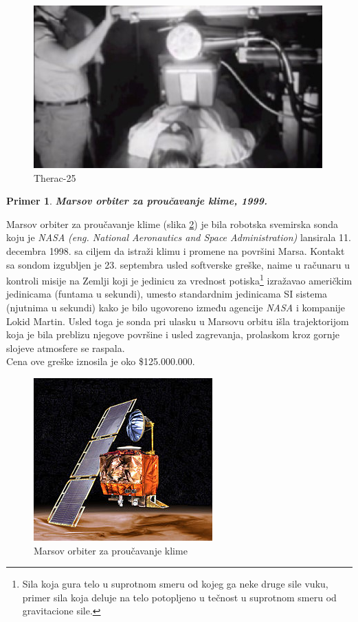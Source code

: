 \documentclass[a4paper]{article}
\newtheorem{primer}{Primer}[section]
\begin{document}
\begin{figure}[h!]
\begin{center}
\includegraphics[scale=0.45]{therac}
\end{center}
\caption{Therac-25}
\label{fig:therac-25}
\end{figure}

\newpage

\begin{primer}
\textbf{Marsov orbiter za proučavanje klime, 1999.}
\end{primer}
Marsov orbiter za proučavanje klime (slika \ref{fig:mco}) je bila robotska svemirska sonda koju je \emph{NASA} \emph{(eng. National Aeronautics and Space Administration)} lansirala 11. decembra 1998. sa ciljem da istraži klimu i promene na površini Marsa. Kontakt sa sondom izgubljen je 23. septembra usled softverske greške, naime u računaru u kontroli misije na Zemlji koji je jedinicu za vrednost potiska\footnote{ Sila koja gura telo u suprotnom smeru od kojeg ga neke druge sile vuku, primer sila koja deluje na telo potopljeno u tečnost u suprotnom smeru od gravitacione sile.} izražavao američkim jedinicama (funtama u sekundi), umesto standardnim jedinicama SI sistema (njutnima u sekundi) kako je bilo ugovoreno između agencije \emph{NASA} i kompanije Lokid Martin. Usled toga je sonda pri ulasku u Marsovu orbitu išla trajektorijom koja je bila preblizu njegove površine i usled zagrevanja, prolaskom kroz gornje slojeve atmosfere se raspala.\\
Cena ove greške iznosila je oko \$125.000.000.

\begin{figure}[h!]
\begin{center}
\includegraphics[scale=0.45]{MCO}
\end{center}
\caption{Marsov orbiter za proučavanje klime}
\label{fig:mco}
\end{figure}
\end{document}
